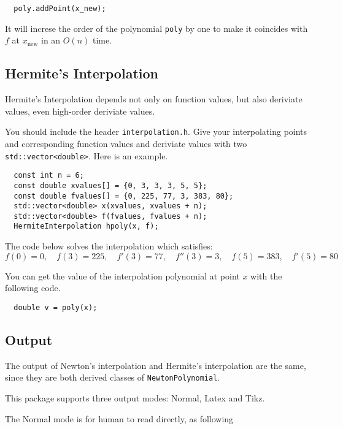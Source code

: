 \documentclass[11pt,en]{elegantpaper}
\begin{document}
\begin{lstlisting}
  poly.addPoint(x_new);
\end{lstlisting}

It will increse the order of the polynomial \verb|poly| by one to make it coincides with $f$ at $x_{\text{new}}$ in an $O(n)$ time.

\subsection{Hermite's Interpolation}

Hermite's Interpolation depends not only on function values, but also deriviate values, even high-order deriviate values.

You should include the header \verb|interpolation.h|. Give your interpolating points and corresponding function values and deriviate values with two \verb|std::vector<double>|. Here is an example.

\begin{lstlisting}
  const int n = 6;
  const double xvalues[] = {0, 3, 3, 3, 5, 5};
  const double fvalues[] = {0, 225, 77, 3, 383, 80};
  std::vector<double> x(xvalues, xvalues + n);
  std::vector<double> f(fvalues, fvalues + n);
  HermiteInterpolation hpoly(x, f);
\end{lstlisting}

The code below solves the interpolation which satisfies:
\begin{equation*}
  f(0)=0,\quad f(3)=225,\quad f'(3)=77,\quad f''(3)=3,\quad f(5)=383, \quad f'(5)=80
\end{equation*}

You can get the value of the interpolation polynomial at point $x$ with the following code.

\begin{lstlisting}
  double v = poly(x);
\end{lstlisting}

\subsection{Output}

The output of Newton's interpolation and Hermite's interpolation are the same, since they are both derived classes of \verb|NewtonPolynomial|.

This package supports three output modes: Normal, Latex and Tikz.

The Normal mode is for human to read directly, as following
\end{document}
